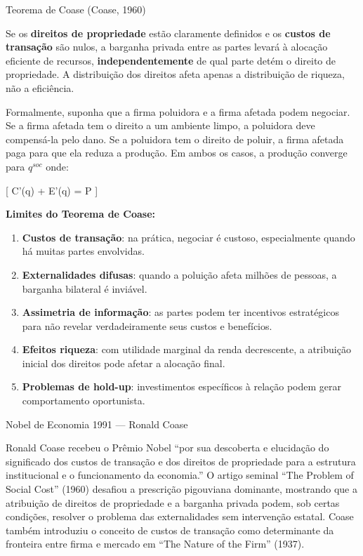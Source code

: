 \documentclass[11pt,twoside,openright]{book}
\providecommand{\tightlist}{\setlength{\itemsep}{0pt}\setlength{\parskip}{0pt}}
\begin{document}
\begin{theorembox}{Teorema de Coase (Coase, 1960)}

Se os \textbf{direitos de propriedade} estão claramente definidos e os
\textbf{custos de transação} são nulos, a barganha privada entre as
partes levará à alocação eficiente de recursos,
\textbf{independentemente} de qual parte detém o direito de propriedade.
A distribuição dos direitos afeta apenas a distribuição de riqueza, não
a eficiência.

\end{theorembox}

Formalmente, suponha que a firma poluidora e a firma afetada podem
negociar. Se a firma afetada tem o direito a um ambiente limpo, a
poluidora deve compensá-la pelo dano. Se a poluidora tem o direito de
poluir, a firma afetada paga para que ela reduza a produção. Em ambos os
casos, a produção converge para \(q^{soc}\) onde:

{[} C'(q) + E'(q) = P \label{eq:20.10}  {]}

\textbf{Limites do Teorema de Coase:}

\begin{enumerate}
\def\labelenumi{\arabic{enumi}.}
\tightlist
\item
  \textbf{Custos de transação}: na prática, negociar é custoso,
  especialmente quando há muitas partes envolvidas.
\item
  \textbf{Externalidades difusas}: quando a poluição afeta milhões de
  pessoas, a barganha bilateral é inviável.
\item
  \textbf{Assimetria de informação}: as partes podem ter incentivos
  estratégicos para não revelar verdadeiramente seus custos e
  benefícios.
\item
  \textbf{Efeitos riqueza}: com utilidade marginal da renda decrescente,
  a atribuição inicial dos direitos pode afetar a alocação final.
\item
  \textbf{Problemas de hold-up}: investimentos específicos à relação
  podem gerar comportamento oportunista.
\end{enumerate}

\begin{infobox}{Nobel de Economia 1991 — Ronald Coase}

Ronald Coase recebeu o Prêmio Nobel ``por sua descoberta e elucidação do
significado dos custos de transação e dos direitos de propriedade para a
estrutura institucional e o funcionamento da economia.'' O artigo
seminal ``The Problem of Social Cost'' (1960) desafiou a prescrição
pigouviana dominante, mostrando que a atribuição de direitos de
propriedade e a barganha privada podem, sob certas condições, resolver o
problema das externalidades sem intervenção estatal. Coase também
introduziu o conceito de custos de transação como determinante da
fronteira entre firma e mercado em ``The Nature of the Firm'' (1937).

\end{infobox}
\end{document}
